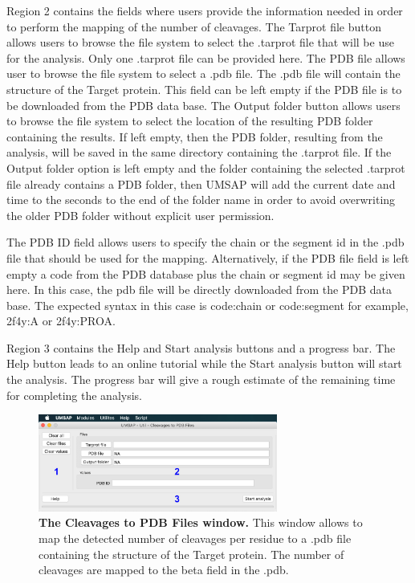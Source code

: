 Region \num{2} contains the fields where users provide the information needed in order to perform the mapping of the number of cleavages. The Tarprot file button allows users to browse the file system to select the .tarprot file that will be use for the analysis. Only one .tarprot file can be provided here. The PDB file allows user to browse the file system to select a .pdb file. The .pdb file will contain the structure of the Target protein. This field can be left empty if the PDB file is to be downloaded from the PDB data base. The Output folder button allows users to browse the file system to select the location of the resulting PDB folder containing the results. If left empty, then the PDB folder, resulting from the analysis, will be saved in the same directory containing the .tarprot file. If the Output folder option is left empty and the folder containing the selected .tarprot file already contains a PDB folder, then UMSAP will add the current date and time to the seconds to the end of the folder name in order to avoid overwriting the older PDB folder without explicit user permission.

The PDB ID field allows users to specify the chain or the segment id in the .pdb file that should be used for the mapping. Alternatively, if the PDB file field is left empty a code from the PDB database plus the chain or segment id may be given here. In this case, the pdb file will be directly downloaded from the PDB data base. The expected syntax in this case is code:chain or code:segment for example, 2f4y:A or 2f4y:PROA.  

Region \num{3} contains the Help and Start analysis buttons and a progress bar. The Help button leads to an online tutorial while the Start analysis button will start the analysis. The progress bar will give a rough estimate of the remaining time for completing the analysis.

\begin{figure}[h]
	\centering
	\includegraphics[width=0.7\textwidth]{./IMAGES/UTIL-PDB-WINDOW/util-pdb.jpg}	    
	\caption[The Cleavages to PDB Files window]{\textbf{The Cleavages to PDB Files window.} This window allows to map the detected number of cleavages per residue to a .pdb file containing the structure of the Target protein. The number of cleavages are mapped to the beta field in the .pdb. } 
	\label{fig:pdbmapset}
	\vspace{-5pt} 	
\end{figure}

